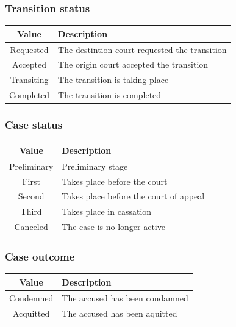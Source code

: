 {\subsubsection{Transition status}
\begin{center}
    \begin{tabular}{c|l}
        \toprule
        \textbf{Value} &
        \textbf{Description}                                           \\
        \midrule
        Requested      & The destintion court requested the transition \\
        Accepted       & The origin court accepted the transition      \\
        Transiting     & The transition is taking place                \\
        Completed      & The transition is completed                   \\
        \bottomrule
    \end{tabular}
\end{center}

\subsubsection{Case status}
\begin{center}
    \begin{tabular}{c|l}
        \toprule
        \textbf{Value} &
        \textbf{Description}                                    \\
        \midrule
        Preliminary    & Preliminary stage                      \\
        First          & Takes place before the court           \\
        Second         & Takes place before the court of appeal \\
        Third          & Takes place in cassation               \\
        Canceled       & The case is no longer active           \\
        \bottomrule
    \end{tabular}
\end{center}

\subsubsection{Case outcome}
\begin{center}
    \begin{tabular}{c|l}
        \toprule
        \textbf{Value} &
        \textbf{Description}                            \\
        \midrule
        Condemned      & The accused has been condamned \\
        Acquitted      & The accused has been aquitted  \\
        \bottomrule
    \end{tabular}
\end{center}

}
